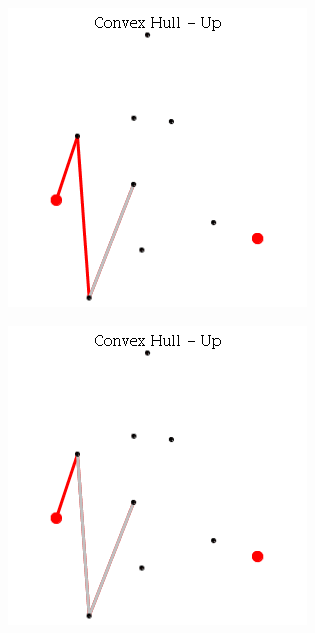 \documentclass[12pt]{article}
\begin{document}
\begin{figure}[h]
\begin{subfigure}[h]{0.275\linewidth}
              \caption{}
            \end{subfigure}
            \begin{subfigure}[h]{0.275\linewidth}
              \includegraphics[width=\linewidth]{GIF/Up-4}
              \caption{}
            \end{subfigure}
            \begin{subfigure}[h]{0.275\linewidth}
              \includegraphics[width=\linewidth]{GIF/Up-5}

\end{subfigure}
\end{figure}
\end{document}
